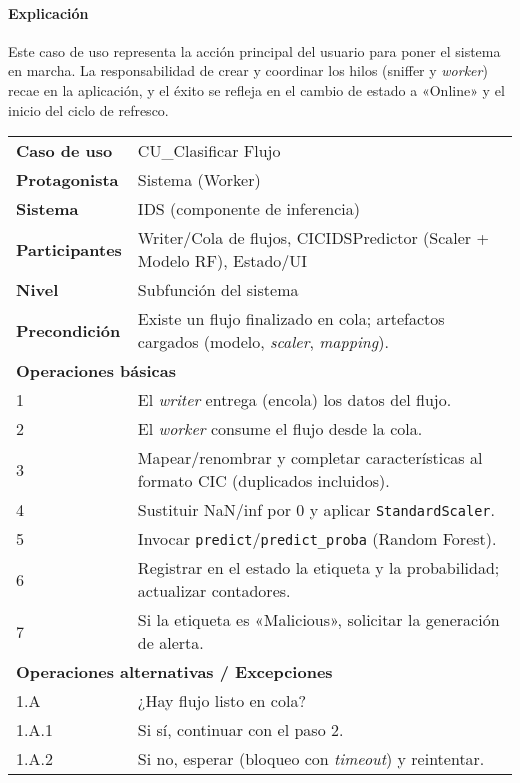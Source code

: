 \paragraph{Explicación}
Este caso de uso representa la acción principal del usuario para poner el sistema en marcha. La responsabilidad de crear y coordinar los hilos (sniffer y \textit{worker}) recae en la aplicación, y el éxito se refleja en el cambio de estado a «Online» y el inicio del ciclo de refresco.

\begin{table}[H]
\centering
\small
\renewcommand{\arraystretch}{1.15}
\begin{tabular}{p{4.0cm} p{10.5cm}}
\hline
\textbf{Caso de uso} & CU\_Clasificar Flujo \\
\textbf{Protagonista} & Sistema (Worker) \\
\textbf{Sistema} & IDS (componente de inferencia) \\
\textbf{Participantes} & Writer/Cola de flujos, CICIDSPredictor (Scaler + Modelo RF), Estado/UI \\
\textbf{Nivel} & Subfunción del sistema \\
\textbf{Precondición} & Existe un flujo finalizado en cola; artefactos cargados (modelo, \textit{scaler}, \textit{mapping}). \\
\hline
\multicolumn{2}{l}{\textbf{Operaciones básicas}}\\
1 & El \textit{writer} entrega (encola) los datos del flujo. \\
2 & El \textit{worker} consume el flujo desde la cola. \\
3 & Mapear/renombrar y completar características al formato CIC (duplicados incluidos). \\
4 & Sustituir NaN/inf por 0 y aplicar \texttt{StandardScaler}. \\
5 & Invocar \texttt{predict}/\texttt{predict\_proba} (Random Forest). \\
6 & Registrar en el estado la etiqueta y la probabilidad; actualizar contadores. \\
7 & Si la etiqueta es «Malicious», solicitar la generación de alerta. \\
\hline
\multicolumn{2}{l}{\textbf{Operaciones alternativas / Excepciones}}\\
1.A & ¿Hay flujo listo en cola? \\
1.A.1 & Si sí, continuar con el paso 2. \\
1.A.2 & Si no, esperar (bloqueo con \textit{timeout}) y reintentar. \\

\end{tabular}
\end{table}
